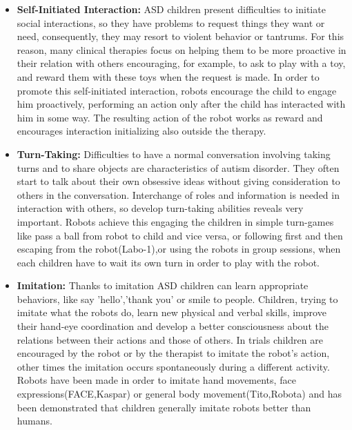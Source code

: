 \begin{itemize}
	\item \textbf{Self-Initiated Interaction:} ASD children present difficulties to initiate social interactions, so they have problems to request things they want or need\cite{ricks2010trends}, consequently, they may resort to violent behavior or tantrums. For this reason, many clinical therapies focus on helping them to be more proactive in their relation with others encouraging, for example, to ask to play with a toy, and reward them with these toys when the request is made. In order to promote this self-initiated interaction, robots encourage the child to engage him proactively, performing an action only after the child has interacted with him in some way. The resulting action of the robot works as reward and encourages interaction initializing also outside the therapy.
	
	\item \textbf{Turn-Taking:} Difficulties to have a normal conversation involving taking turns and to share objects are characteristics of autism disorder. They often start to talk about their own obsessive ideas without giving consideration to others in the conversation. Interchange of roles and information is needed in interaction with others, so develop turn-taking abilities reveals very important. Robots achieve this engaging the children in simple turn-games like pass a ball from robot to child and vice versa\cite{costa2010promoting}, or following first and then escaping from the robot(Labo-1\cite{dautenhahn2003towards}),or using the robots in group sessions, when each children have to wait its own turn in order to play with the robot\cite{werry2001can}.
	
	\item \textbf{Imitation:} Thanks to imitation ASD children can learn appropriate behaviors, like say 'hello','thank you' or smile to people. Children, trying to imitate what the robots do, learn new physical and verbal skills, improve their hand-eye coordination and develop a better consciousness about the relations between their actions and those of others. In trials children are encouraged by the robot or by the therapist to imitate the robot's action\cite{duquette2008exploring,ferrari2009therapeutic,robins2005robotic,robins2004effects}, other times the imitation occurs spontaneously during a different activity\cite{kozima2007children,robins2009isolation,kozima2005interactive}. Robots have been made in order to imitate hand movements\cite{bird2007intact}, face expressions(FACE\cite{pioggia2007human},Kaspar) or general body movement(Tito,Robota\cite{duquette2008exploring}) and has been demonstrated that children generally imitate robots better than humans\cite{bird2007intact,pioggia2008exploring,duquette2008exploring}. 
	

\end{itemize}
